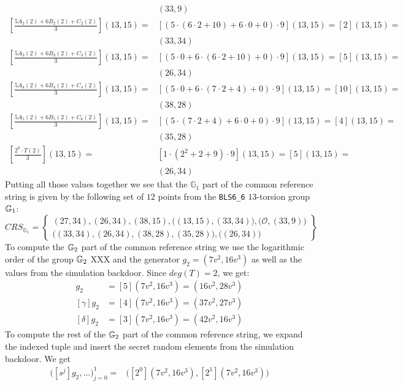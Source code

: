 \begin{example}
\begin{align*}
 & (33,9) \\
[\frac{5 A_{2}(2)+ 6 B_{2}(2) + C_{2}(2)}{3}](13,15) =
 & [(5\cdot (6\cdot 2 +10) +6\cdot 0 +0 )\cdot 9](13,15) = [2](13,15) = \\
 & (33,34) \\
[\frac{5 A_{3}(2)+ 6 B_{3}(2) + C_{3}(2)}{3}](13,15) =
 & [(5\cdot 0 +6\cdot (6\cdot 2 + 10) + 0 )\cdot 9](13,15) = [5](13,15) = \\
 & (26,34) \\
[\frac{5 A_{4}(2)+ 6 B_{4}(2) + C_{4}(2)}{3}](13,15) = 
 & [(5\cdot 0+6\cdot(7\cdot 2 +4)+0)\cdot 9](13,15) =[10](13,15) = \\
 & (38,28) \\
[\frac{5 A_{5}(2)+ 6 B_{5}(2) + C_{6}(2)}{3}](13,15) =
 & [(5\cdot (7\cdot 2 + 4) +6\cdot 0 + 0 )\cdot 9](13,15) = [4](13,15) = \\
 & (35,28)\\
[\frac{2^0\cdot T(2)}{3}](13,15) =
 & [1\cdot (2^2+2+9)\cdot 9](13,15)= [5](13,15) = \\
 & (26,34)
\end{align*}
Putting all those values together we see that the $\mathbb{G}_1$ part of the common reference string is given by the following set of $12$ points from the \texttt{BLS6\_6} $13$-torsion group $\mathbb{G}_1$: 
$$
CRS_{\mathbb{G}_{1}}=\left\{ \begin{array}{c}
(27,34),(26,34),(38,15),\Big((13,15),(33,34)\Big),
\Big(\mathcal{O}, (33,9)\Big)\\
\Big((33,34),(26,34),(38,28),(35,28)\Big),
\Big((26,34)\Big)
\end{array}\right\}
$$
To compute the $\mathbb{G}_2$ part of the common reference string we use the logarithmic order of the group $\mathbb{G}_2$ XXX and the generator $g_2=(7v^2,16v^3)$ as well as the values from the simulation backdoor. Since $deg(T)=2$, we get:
\begin{align*}
[\beta]g_2 & = [5](7v^2,16v^3) = (16v^2,28v^3) \\
[\gamma]g_2 & = [4](7v^2,16v^3) = (37v^2,27v^3) \\
[\delta]g_2 & = [3](7v^2,16v^3) = (42v^2,16v^3)
\end{align*}
To compute the rest of the $\mathbb{G}_2$ part of the common reference string, we expand the indexed tuple and insert the secret random elements from the simulation backdoor. We get
\begin{align*}
\Big( [s^{j}]g_2,\ldots\Big) _{j=0}^{1} = 
 & \Big( [2^0](7v^2,16v^3), [2^1](7v^2,16v^3)\Big)  \\

\end{align*}
\end{example}
